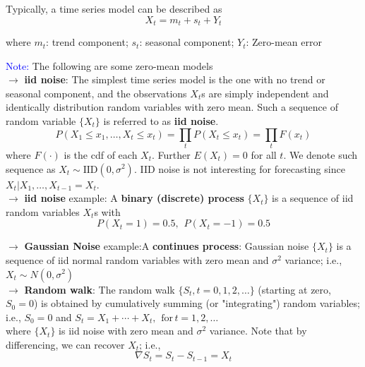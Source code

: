 \documentclass[letterpaper, 10.5pt,landscape]{article}
\begin{document}
\begin{multicols*}{3}
Typically, a time series model can be described as 
\vspace{-3pt}
\[X_{t} = m_{t} + s_{t} + Y_{t} \]

where $m_{t}$: trend component; $s_{t}$: seasonal component; $Y_{t}$: Zero-mean error 

\vspace{3pt}
\textcolor{blue}{Note:} The following are some zero-mean models \\

$\rightarrow$ \textbf{iid noise}: The simplest time series model is the one with no trend or seasonal component, and the observations $X_{t}$s are simply independent and identically distribution random variables with zero mean. Such a sequence of random variable $\{X_{t}\}$ is referred to as \textbf{iid noise}.
\vspace{-3pt}
\[P\left(X_{1} \leq x_{1}, \ldots, X_{t} \leq x_{t} \right) = \prod_{t} P \left(X_{t} \leq x_{t}\right) = \prod_{t} F(x_{t})\] where $F(\cdot)$ is the cdf of each $X_{t}$. Further $E(X_{t}) = 0$ for all $t$. We denote such sequence as $X_{t} \sim \text{IID}(0, \sigma^{2})$. IID noise is not interesting for forecasting since $X_{t}|X_{1}, \ldots, X_{t-1} = X_{t}$. \\

$\rightarrow$ \textbf{iid noise} example: A \textbf{binary (discrete) process} $\{X_{t} \}$ is a sequence of iid random variables $X_{t}$s with 
\vspace{-3pt}
\[P(X_{t} = 1) = 0.5, \hspace{5pt} P(X_{t} = -1) = 0.5 \]

\vspace{3pt}
$\rightarrow$ \textbf{Gaussian Noise} example:A \textbf{continues process}: Gaussian noise $\{X_{t}\}$ is a sequence of iid normal random variables with zero mean and $\sigma^{2}$ variance; i.e., \(X_{t} \sim N (0, \sigma^{2})\) \\


\vspace{3pt}
$\rightarrow$ \textbf{Random walk}: The random walk $\{S_{t}, t=0,1,2, \ldots \}$ (starting at zero, $S_{0} = 0$) is obtained by cumulatively summing (or "integrating") random variables; i.e., $S_{0}=0$ and $S_{t} = X_{1} + \cdots + X_{t}, \hspace{5pt} \text{for} \hspace{2pt} t=1,2,\ldots$ \\
where $\{X_{t} \}$ is iid noise with zero mean and $\sigma^{2}$ variance. Note that by differencing, we can recover $X_{t}$; i.e.,
\vspace{-3pt}
\[\nabla  S_{t} = S_{t} - S_{t-1} = X_{t} \]


\end{multicols*}
\end{document}
